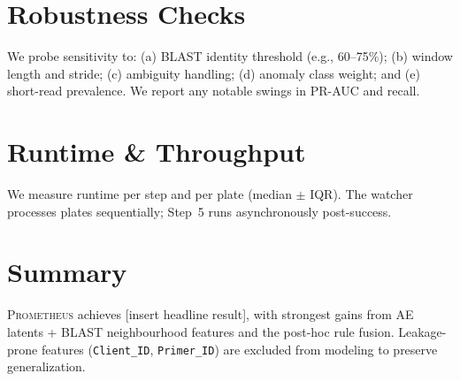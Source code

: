 \section{Robustness Checks}
\label{sec:robustness}
We probe sensitivity to: (a) BLAST identity threshold (e.g., 60–75\%); (b) window length and stride; (c) ambiguity handling; (d) anomaly class weight; and (e) short-read prevalence.
We report any notable swings in PR-AUC and recall.

\section{Runtime \& Throughput}
\label{sec:runtime}
We measure runtime per step and per plate (median $\pm$ IQR). The watcher processes plates sequentially; Step~5 runs asynchronously post-success.

\section{Summary}
\label{sec:eval_summary}
\textsc{Prometheus} achieves [insert headline result], with strongest gains from AE latents + BLAST neighbourhood features and the post-hoc rule fusion. Leakage-prone features (\texttt{Client\_ID}, \texttt{Primer\_ID}) are excluded from modeling to preserve generalization.
